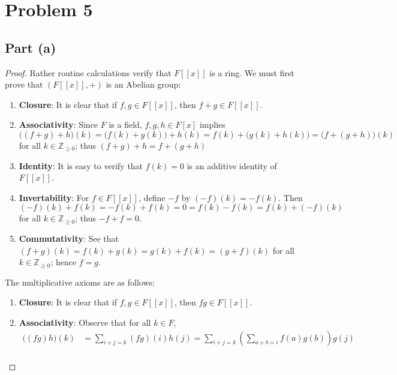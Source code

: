 \documentclass[11pt]{article}
\begin{document}

\section{Problem 5}


\subsection{Part (a)}

\begin{proof}
  Rather routine calculations verify that $F[[x]]$ is a ring. We must first prove that $(F[[x]], +)$ is an Abelian group:
  \begin{enumerate}
    \item \textbf{Closure}: It is clear that if $f, g \in F[[x]]$, then $f + g \in F[[x]]$.
    \item \textbf{Associativity}: Since $F$ is a field, $f, g, h \in F[x]$ implies
    \[
      \big( (f + g) + h \big)(k) = \big( f(k) + g(k) \big) + h(k) = f(k) + \big( g(k) + h(k) \big) = \big( f + (g + h) \big)(k)
    \]
    for all $k \in \mathbb{Z}_{\ge 0}$; thus $(f + g) + h = f + (g + h)$
    \item \textbf{Identity}: It is easy to verify that $f(k) = 0$ is an additive identity of $F[[x]]$.
    \item \textbf{Invertability}: For $f \in F[[x]]$, define $-f$ by $(-f)(k) = -f(k)$. Then
    \[
      (-f)(k) + f(k) = -f(k) + f(k) = 0 = f(k) - f(k) = f(k) + (-f)(k)
    \]
    for all $k \in \mathbb{Z}_{\ge 0}$; thus $-f + f = 0$.
    \item \textbf{Commutativity}: See that $(f + g)(k) = f(k) + g(k) = g(k) + f(k) = (g + f)(k)$ for all $k \in \mathbb{Z}_{\ge 0}$; hence $f = g$.
  \end{enumerate}
  The multiplicative axioms are as follows:
  \begin{enumerate}\addtocounter{enumi}{5}
    \item \textbf{Closure}: It is clear that if $f, g \in F[[x]]$, then $fg \in F[[x]]$.
    \item \textbf{Associativity}: Observe that for all $k \in F$,
      \begin{align*}
        \big( (fg)h \big)(k) &= \sum\limits_{i + j = k} (fg)(i) h(j) = \sum\limits_{i + j = k} \left( \sum\limits_{a + b = i} f(a)g(b) \right) g(j) \\

\end{align*}
\end{enumerate}
\end{proof}
\end{document}
